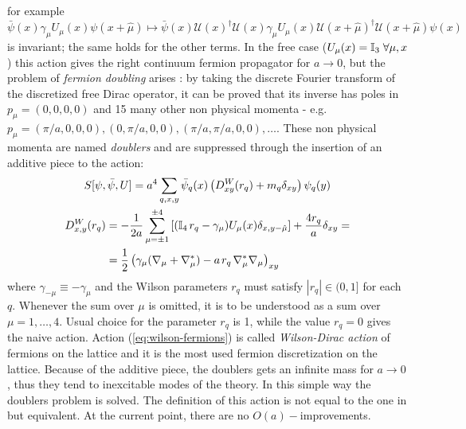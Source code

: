 \documentclass[english, LaM, oneside, noexaminfo]{sapthesis}
\begin{document}
for example $\bar \psi (x) \gamma_\mu U_\mu (x) \psi (x + \hat \mu) \mapsto \bar\psi (x) \mathcal{U}(x)^\dagger \mathcal{U} (x) \gamma_\mu U_\mu (x) \mathcal{U} (x+\hat\mu)^\dagger \mathcal{U}(x+\hat\mu) \psi (x)$ is invariant;
the same holds for the other terms.
\newline
In the free case ($U_\mu (x) = \mathbb{I}_3 \hspace*{1mm} \forall \mu ,x$) this action gives the right continuum fermion propagator for $a\rightarrow 0$, but the problem of \textit{fermion doubling} arises \cite{montvay-munster}:
by taking the discrete Fourier transform of the discretized free Dirac operator, it can be proved that its inverse has poles in $p_\mu = (0,0,0,0)$ and 15 many other non physical momenta - e.g. $p_\mu = (\pi/a,0,0,0), (0,\pi/a,0,0), (\pi/a,\pi/a,0,0),\dots$.
These non physical momenta are named \textit{doublers} and are suppressed through the insertion of an additive piece to the action:
\begin{equation}\label{eq:wilson-fermions}
    \begin{gathered}
        S[\psi,\bar \psi, U] = a^4\sum_{q,x,y} \bar \psi_q (x) \left( D^W_{xy}(r_q) + m_q \delta_{xy}  \right) \psi_q (y) \\
        \begin{aligned}
            D_{x,y}^W (r_q)
            & = -\frac{1}{2a}\sum_{\mu = \pm 1}^{\pm 4} \left[ (\mathbb{I}_4 \hspace*{0.5mm} r_q - \gamma_\mu)U_\mu (x) \delta_{x,y-\hat \mu} \right] + \frac{4r_q}{a}\delta_{xy} = \\
            & = \frac{1}{2}\left(\gamma_\mu(\nabla_\mu +\nabla_\mu^*) - a\hspace*{0.5mm}r_q\hspace*{0.5mm}\nabla_\mu^*\nabla_\mu\right)_{xy}
        \end{aligned}
    \end{gathered}
\end{equation}
where $\gamma_{-\mu} \equiv -\gamma_\mu$ and the Wilson parameters $r_q$ must satisfy $|r_q|\in(0,1]$ for each $q$.
Whenever the sum over $\mu$ is omitted, it is to be understood as a sum over $\mu = 1, \dots, 4$.
Usual choice for the parameter $r_q$ is 1, while the value $r_q = 0$ gives the naive action.
Action (\ref{eq:wilson-fermions}) is called \textit{Wilson-Dirac action} of fermions on the lattice and it is the most used fermion discretization on the lattice.
Because of the additive piece, the doublers gets an infinite mass for $a \rightarrow 0$, thus they tend to inexcitable modes of the theory.
In this simple way the doublers problem is solved.
The definition of this action is not equal to the one in \cite{montvay-munster}\cite{gattringer-lang} but equivalent.
At the current point, there are no $O(a)-$improvements.
\end{document}
